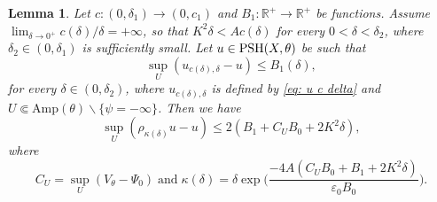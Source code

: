 \documentclass[a4paper,11pt]{amsart}
\numberwithin{equation}{section}
\newtheorem{lemma}[theorem]{Lemma}
\theoremstyle{definition}
\newcommand{\PSH}{{\rm PSH}}
\newcommand{\R}{\mathbb{R}}
\begin{document}
\begin{lemma}\label{lem thmD Dem et al}
	Let $c: (0, \delta_1)\rightarrow (0, c_1)$ and $B_1:\R^+\rightarrow\R^+$ be functions. Assume $\lim_{\delta\to 0^+}c(\delta)/\delta=+\infty$, so that $K^2\delta<Ac(\delta)$ for every $0<\delta<\delta_2$, where $\delta_2\in (0, \delta_1)$ is sufficiently small. 
    Let $u\in\PSH(X,\theta)$ be such that
	\begin{equation}\label{eq0 lem thmD Dem et al}
	\sup_{U}(u_{c(\delta), \delta}-u)\leq  B_1(\delta),
	\end{equation}
	for every $\delta\in(0,\delta_2)$, where $u_{c(\delta),\delta}$ is defined by \eqref{eq: u c delta} and 
    $U\Subset \textrm{Amp}(\theta)\backslash\{\psi=-\infty\}$. Then we have \begin{equation}\label{eq: delta_diff}
	\sup_U(\rho_{\kappa(\delta)}u-u)\leq 2(B_1+C_UB_0+2K^2\delta),
	\end{equation}
where
	\begin{equation*}
	    C_U=\sup_U(V_{\theta}-\Psi_0) \;\text{and}\; \kappa(\delta)=\delta\exp\Big(\dfrac{-4A(C_UB_0+B_1+2K^2\delta)}{\varepsilon_0B_0} \Big).
	\end{equation*}
\end{lemma}
\end{document}
